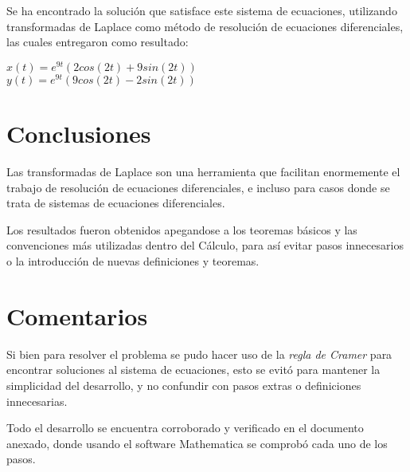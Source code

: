 \documentclass[12pt,letterpaper]{article}
\begin{document}
Se ha encontrado la solución que satisface este sistema de ecuaciones, utilizando transformadas de Laplace como método de resolución de ecuaciones diferenciales, las cuales entregaron como resultado:

\begin{center}
	$x(t) = e^{9t}\left(2cos(2t) + 9sin(2t)\right)$ \\
	$y(t) = e^{9t}\left(9cos(2t) - 2sin(2t) \right)$
\end{center}

\section{Conclusiones}
Las transformadas de Laplace son una herramienta que facilitan enormemente el trabajo de resolución de ecuaciones diferenciales, e incluso para casos donde se trata de sistemas de ecuaciones diferenciales.

Los resultados fueron obtenidos apegandose a los teoremas básicos y las convenciones más utilizadas dentro del Cálculo, para así evitar pasos innecesarios o la introducción de nuevas definiciones y teoremas.

\section{Comentarios}
Si bien para resolver el problema se pudo hacer uso de la \textit{regla de Cramer} para encontrar soluciones al sistema de ecuaciones, esto se evitó para mantener la simplicidad del desarrollo, y no confundir con pasos extras o definiciones innecesarias.

Todo el desarrollo se encuentra corroborado y verificado en el documento anexado, donde usando el software Mathematica se comprobó cada uno de los pasos.


\end{document}
